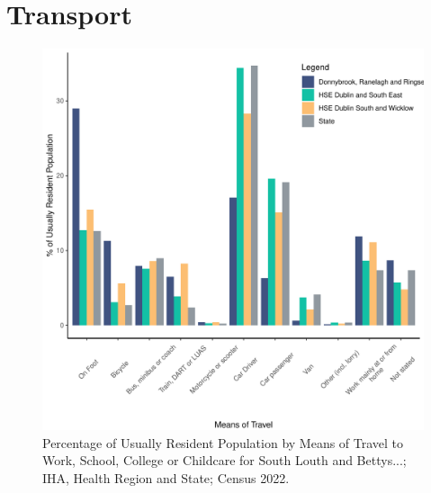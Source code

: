 \documentclass{article}
\begin{document}
\section{Transport}\label{sect:Trans}
\begin{figure}[H]
	\centering
	\includegraphics[width = 120mm]{../figures/TravelED.pdf}
	\caption{Percentage of Usually Resident Population by Means of Travel to Work, School, College or Childcare for South Louth and Bettys...; IHA, Health Region and State; Census 2022.}
	\label{fig:vbnv}
	\end{figure}
\end{document}
